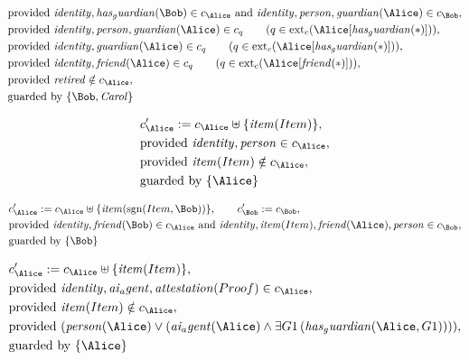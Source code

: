 \begin{align*}
&
\text{provided } 
\mathit{
identity
}
,
\mathit{
has_guardian
}
(
\Bob
)
 \in c_
{
\Alice
}
 \text{ and } 
\mathit{
identity
}
,
\mathit{
person
}
,
\mathit{
guardian
}
(
\Alice
)
 \in c_
{
\Bob
}
,\\
&
\text{provided } 
\mathit{
identity
}
,
\mathit{
person
}
,
\mathit{
guardian
}
(
\Alice
)
 \in c_
q
 \qquad (
q \in 
\mathrm{ext}_c(
\Alice
[
\mathit{
has_guardian
}
(
\ast
)
]
)
)
,\\
&
\text{provided } 
\mathit{
identity
}
,
\mathit{
guardian
}
(
\Alice
)
 \in c_
q
 \qquad (
q \in 
\mathrm{ext}_c(
\Alice
[
\mathit{
has_guardian
}
(
\ast
)
]
)
)
,\\
&
\text{provided } 
\mathit{
identity
}
,
\mathit{
friend
}
(
\Alice
)
 \in c_
q
 \qquad (
q \in 
\mathrm{ext}_c(
\Alice
[
\mathit{
friend
}
(
\ast
)
]
)
)
,\\
&
\text{provided } 
\mathit{
retired
}
 \notin c_
{
\Alice
}
,\\
&
\text{guarded by } \{
\Bob
,
\mathit{Carol}
\}
\end{align*}

\begin{align*}
&
c'_
{
\Alice
}
 := 
c_
{
\Alice
}
 \uplus 
\{
\mathit{
item
}
(
Item
)
\}
,\\
&
\text{provided } 
\mathit{
identity
}
,
\mathit{
person
}
 \in c_
{
\Alice
}
,\\
&
\text{provided } 
\mathit{
item
}
(
Item
)
 \notin c_
{
\Alice
}
,\\
&
\text{guarded by } \{
\Alice
\}
\end{align*}

\begin{align*}
&
c'_
{
\Alice
}
 := 
c_
{
\Alice
}
 \uplus 
\{
\mathit{
item
}
(
\mathrm{sgn}(
Item
,
\Bob
)
)
\}
, \qquad 
c'_
{
\Bob
}
 := 
c_
{
\Bob
}
,\\
&
\text{provided } 
\mathit{
identity
}
,
\mathit{
friend
}
(
\Bob
)
 \in c_
{
\Alice
}
 \text{ and } 
\mathit{
identity
}
,
\mathit{
item
}
(
Item
)
,
\mathit{
friend
}
(
\Alice
)
,
\mathit{
person
}
 \in c_
{
\Bob
}
,\\
&
\text{guarded by } \{
\Bob
\}
\end{align*}

\begin{align*}
&
c'_
{
\Alice
}
 := 
c_
{
\Alice
}
 \uplus 
\{
\mathit{
item
}
(
Item
)
\}
,\\
&
\text{provided } 
\mathit{
identity
}
,
\mathit{
ai_agent
}
,
\mathit{
attestation
}
(
Proof
)
 \in c_
{
\Alice
}
,\\
&
\text{provided } 
\mathit{
item
}
(
Item
)
 \notin c_
{
\Alice
}
,\\
&
\text{provided } 
(
\mathit{
person
}
(
\Alice
)
\lor
(
\mathit{
ai_agent
}
(
\Alice
)
\land
\exists 
G1
\,(
\mathit{
has_guardian
}
(
\Alice
,
G1
)
)
)
)
,\\
&
\text{guarded by } \{
\Alice
\}
\end{align*}
